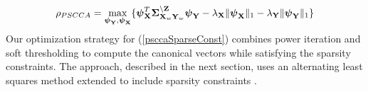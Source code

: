 \documentclass{llncs}
\newcommand{\X}{{\bf X}}
\newcommand{\Y}{{\bf Y}}
\newcommand{\Z}{{\bf Z}}
\newcommand{\bs}{\boldsymbol}
\begin{document}
\begin{equation}
\label{psccaSparseConst}
\rho_{PSCCA}=\max_{{\bs\psi_{\Y}}, {\bs\psi_{\X}}} \{ \bs\psi_{\X}^T \bs\Sigma_{\X_w\Y_w}^{\backslash \Z}\bs\psi_{\Y} - \lambda_{\X}\|\bs\psi_{\X}\|_1 - \lambda_{\Y}\|\bs\psi_{\Y}\|_1\}
\end{equation}
Our optimization strategy for (\ref{psccaSparseConst}) combines power
iteration and soft thresholding to compute the canonical vectors while
satisfying  the sparsity constraints.  The approach, described in the next
section, uses an alternating least squares method
\cite{golub} extended to include sparsity constraints
\cite{cichocki}. 



\end{document}

